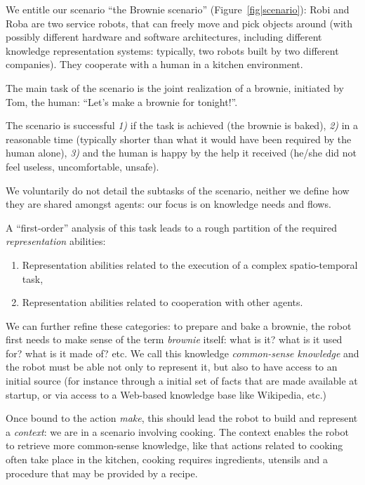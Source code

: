 We entitle our scenario ``the Brownie scenario'' (Figure~\ref{fig|scenario}):
Robi and Roba are two service robots, that can freely move and pick objects
around (with possibly different hardware and software architectures, including
different knowledge representation systems: typically, two robots built by two
different companies). They cooperate with a human in a kitchen environment.

The main task of the scenario is the joint realization of a brownie, initiated
by Tom, the human: ``Let's make a brownie for tonight!''.

The scenario is successful {\it 1)} if the task is achieved (the brownie is baked),
{\it 2)} in a reasonable time (typically shorter than what it would have been
required by the human alone), {\it 3)} and the human is happy by the help it received
(he/she did not feel useless, uncomfortable, unsafe).

We voluntarily do not detail the subtasks of the scenario, neither we define
how they are shared amongst agents: our focus is on knowledge needs and flows.

A ``first-order'' analysis of this task leads to a rough partition of the
required \emph{representation} abilities:

\begin{enumerate}

	\item Representation abilities related to the execution of a complex
	spatio-temporal task,

	\item Representation abilities related to cooperation with other agents.

\end{enumerate}

We can further refine these categories: to prepare and bake a brownie, the
robot first needs to make sense of the term \emph{brownie} itself: what is it?
what is it used for? what is it made of? etc. We call this knowledge
\emph{common-sense knowledge} and the robot must be able not only to represent
it, but also to have access to an initial source (for instance through a
initial set of facts that are made available at startup, or via access to a
Web-based knowledge base like Wikipedia, etc.)

Once bound to the action \emph{make}, this should lead the robot to build and
represent a \emph{context}: we are in a scenario involving cooking. The context
enables the robot to retrieve more common-sense knowledge, like that actions
related to cooking often take place in the kitchen, cooking requires
ingredients, utensils and a procedure that may be provided by a recipe.

